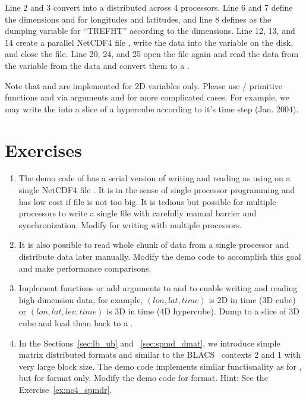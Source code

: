 Line 2 and 3 convert  into a  distributed
across 4 processors. Line 6 and 7 define the dimensions
 and  for longitudes and latitudes, and line 8
defines  as the dumping variable for ``TREFHT'' according
to the dimensions.
 Line 12, 13, and 14 create a parallel NetCDF4 file
,
write the data into the variable on the disk, and close the file.
Line 20, 24, and 25 open the file again and read the data from the
variable from the data and convert them to a
.

Note that  and  are implemented
for 2D variables only. Please use / primitive functions
 and  via arguments 
and  for more complicated cases. For example, we may write
the  into a slice of a hypercube according to it's time step
(Jan. 2004).


\section{Exercises}
\label{sec:pbdNCDF4_exercise}

\begin{enumerate}[label=\thechapter-\arabic*]
\item
The demo code  of  has a serial version
of writing and reading  as using  on a single
NetCDF4 file . It is in the sense of single processor
programming and has low cost if file is not too big.
It is tedious but possible for multiple processors to write
a single file with carefully manual barrier and synchronization.
Modify  for writing with multiple processors.

\item
It is also possible to read whole chunk of data from a single processor
and distribute data later manually. Modify the demo code
 to accomplish this goal and make performance
comparisons.

\item
Implement functions or add arguments to  and
 to enable writing and reading high dimension data,
for example, $(lon, lat, time)$ is 2D in time (3D cube) or
$(lon, lat, lev, time)$ is 3D in time (4D hypercube).
Dump  to a slice of 3D cube and load them back to a
.

\item
In the Sections~\ref{sec:lb_ub} and ~\ref{sec:spmd_dmat}, we introduce
simple matrix distributed formats  and  similar to
the BLACS~ contexts  2 and 1 with very large block size.
The demo code
 implements similar functionality as for
, but for  format only. Modify the demo code for
 format.
{\color{blue}Hint: See the Exercise~\ref{ex:nc4_spmdr}.
}

\end{enumerate}

